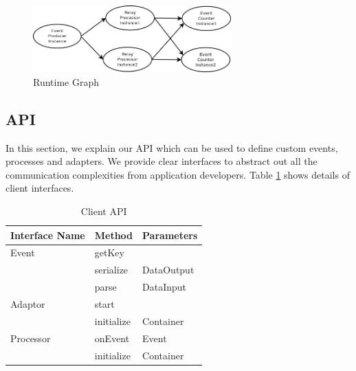 \begin{figure}[!t]
        \centering
        \includegraphics[width=3.0in]{runtimegraph.png}
        \caption{Runtime Graph}
        \label{runtimegraph}
\end{figure}

\subsection{API}
In this section, we explain our API which can be used to define custom events, processes and adapters. We provide clear interfaces to abstract out all the communication complexities from application developers. Table \ref{api} shows details of client interfaces.



\begin{table}[ht]
	\centering
	\begin{tabular}{| l | l | l |}
        \hline
        Interface Name &  Method & Parameters \\
        \hline
        Event   & getKey &  \\
        \cline{2-3}
        & serialize &  DataOutput \\
	\cline{2-3}        
        & parse &  DataInput \\
        \hline
        Adaptor   & start &  \\
        \cline{2-3}
        & initialize &  Container \\
        \hline
        Processor   & onEvent & Event \\
        \cline{2-3}
        & initialize &  Container \\
        \hline
        \end{tabular}
        \caption{Client API}
        \label{api}
\end{table}


